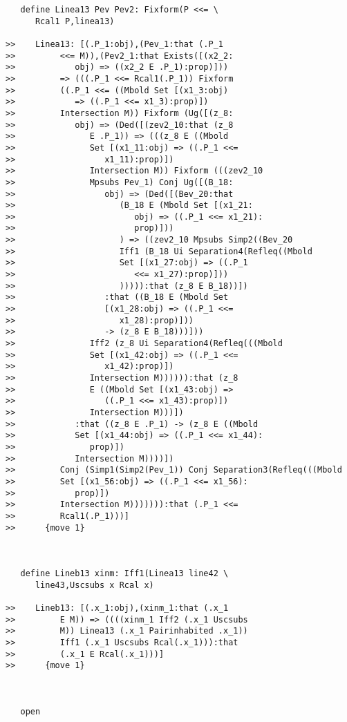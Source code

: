 \documentclass[12pt]{article}
\begin{document}
\begin{verbatim}
   define Linea13 Pev Pev2: Fixform(P <<= \
      Rcal1 P,linea13)

>>    Linea13: [(.P_1:obj),(Pev_1:that (.P_1
>>         <<= M)),(Pev2_1:that Exists([(x2_2:
>>            obj) => ((x2_2 E .P_1):prop)]))
>>         => (((.P_1 <<= Rcal1(.P_1)) Fixform
>>         ((.P_1 <<= ((Mbold Set [(x1_3:obj)
>>            => ((.P_1 <<= x1_3):prop)])
>>         Intersection M)) Fixform (Ug([(z_8:
>>            obj) => (Ded([(zev2_10:that (z_8
>>               E .P_1)) => (((z_8 E ((Mbold
>>               Set [(x1_11:obj) => ((.P_1 <<=
>>                  x1_11):prop)])
>>               Intersection M)) Fixform (((zev2_10
>>               Mpsubs Pev_1) Conj Ug([(B_18:
>>                  obj) => (Ded([(Bev_20:that
>>                     (B_18 E (Mbold Set [(x1_21:
>>                        obj) => ((.P_1 <<= x1_21):
>>                        prop)]))
>>                     ) => ((zev2_10 Mpsubs Simp2((Bev_20
>>                     Iff1 (B_18 Ui Separation4(Refleq((Mbold
>>                     Set [(x1_27:obj) => ((.P_1
>>                        <<= x1_27):prop)]))
>>                     ))))):that (z_8 E B_18))])
>>                  :that ((B_18 E (Mbold Set
>>                  [(x1_28:obj) => ((.P_1 <<=
>>                     x1_28):prop)]))
>>                  -> (z_8 E B_18)))]))
>>               Iff2 (z_8 Ui Separation4(Refleq(((Mbold
>>               Set [(x1_42:obj) => ((.P_1 <<=
>>                  x1_42):prop)])
>>               Intersection M)))))):that (z_8
>>               E ((Mbold Set [(x1_43:obj) =>
>>                  ((.P_1 <<= x1_43):prop)])
>>               Intersection M)))])
>>            :that ((z_8 E .P_1) -> (z_8 E ((Mbold
>>            Set [(x1_44:obj) => ((.P_1 <<= x1_44):
>>               prop)])
>>            Intersection M))))])
>>         Conj (Simp1(Simp2(Pev_1)) Conj Separation3(Refleq(((Mbold
>>         Set [(x1_56:obj) => ((.P_1 <<= x1_56):
>>            prop)])
>>         Intersection M))))))):that (.P_1 <<=
>>         Rcal1(.P_1)))]
>>      {move 1}



   define Lineb13 xinm: Iff1(Linea13 line42 \
      line43,Uscsubs x Rcal x)

>>    Lineb13: [(.x_1:obj),(xinm_1:that (.x_1
>>         E M)) => ((((xinm_1 Iff2 (.x_1 Uscsubs
>>         M)) Linea13 (.x_1 Pairinhabited .x_1))
>>         Iff1 (.x_1 Uscsubs Rcal(.x_1))):that
>>         (.x_1 E Rcal(.x_1)))]
>>      {move 1}



   open


\end{verbatim}
\end{document}
